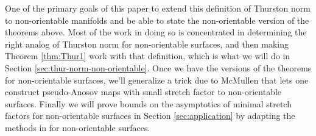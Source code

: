 One of the primary goals of this paper to extend this definition of Thurston norm to non-orientable manifolds
and be able to state the non-orientable version of the theorems above. Most of the work in doing so is
concentrated in determining the right analog of Thurston norm for non-orientable surfaces, and then making
Theorem \ref{thm:Thur1} work with that definition, which is what we will do in Section \ref{sec:thur-norm-non-orientable}. Once we have the
versions of the theorems for non-orientable surfaces, we'll generalize a trick due
to McMullen that lets one construct pseudo-Anosov maps with small stretch factor to non-orientable surfaces. Finally we will prove
bounds on the asymptotics of minimal stretch factors for non-orientable surfaces in Section
\ref{sec:application} by adapting the methods in \cite{yazdi2018pseudo} for non-orientable surfaces.